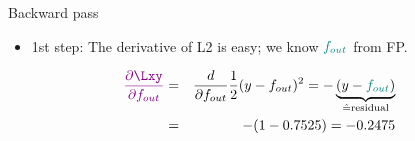 \begin{vbframe}{Backward pass}
  \begin{itemize}
    \item 1st step: The derivative of L2 is easy; we know $\textcolor{teal}{f_{out}}$ from FP.
  \end{itemize}
    \begin{eqnarray*}
      \textcolor{violet}{\frac{\partial \Lxy}{\partial f_{out}}} &=& \frac{d}{\partial f_{out}} \frac{1}{2}(y - f_{out})^2 = -\underbrace{(y - \textcolor{teal}{f_{out}})}_{\hat{=} \text{residual}} \\
       &=& -(1 - \num[round-mode=places,round-precision=4]{0.7525469}) = \num[round-mode=places,round-precision=4]{-0.2474531}
    \end{eqnarray*}
    \begin{figure}
      \centering
    \end{figure}
\framebreak


\end{vbframe}
